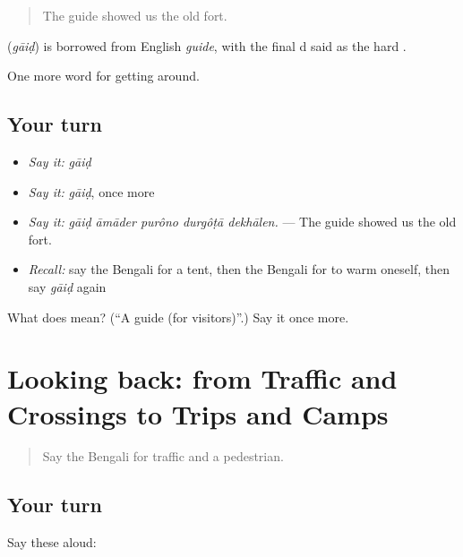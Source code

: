\begin{quote}
The guide showed us the old fort.
\end{quote}

\begin{cousinweb}
\textbf{} (\emph{gāiḍ}) is borrowed from English \emph{guide}, with the final d said as the hard .
\end{cousinweb}

\begin{grammarlens}[title={What you've built}]
One more word for getting around.
\end{grammarlens}

\subsection*{Your turn}
\begin{itemize}
\raggedright
  \item \emph{Say it:} \emph{gāiḍ}
  \item \emph{Say it:} \emph{gāiḍ}, once more
  \item \emph{Say it:} \emph{gāiḍ āmāder purôno durgôṭā dekhālen.} — The guide showed us the old fort.
  \item \emph{Recall:} say the Bengali for a tent, then the Bengali for to warm oneself, then say \emph{gāiḍ} again
\end{itemize}

\begin{tcolorbox}[breakable,colback=teal!4,colframe=teal!35!black,title={Before you move on}]
What does  mean? (\textquotedblleft{}A guide (for visitors)\textquotedblright{}.) Say it once more.
\end{tcolorbox}
\section[(dialogue)]{Looking back: from Traffic and Crossings to Trips and Camps}

\label{lesson:BN-R399-review-392-399}



\begin{quote}
Say the Bengali for traffic and a pedestrian.
\end{quote}

\subsection*{Your turn}
Say these aloud:

